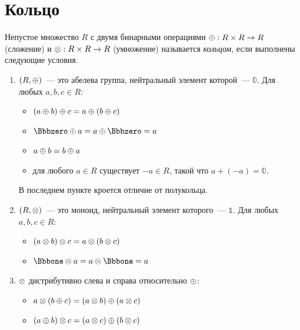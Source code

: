 \section{Кольцо}
\label{sec:Ring}

\begin{definition}[Кольцо]
    Непустое множество $R$ с двумя бинарными операциями $\oplus: R \times R \to R$ (сложение) и $\otimes: R \times R \to R$ (умножение) называется \emph{кольцом}, если выполнены следующие условия.
    \begin{enumerate}
        \item $(R, \oplus)$~--- это абелева группа, нейтральный элемент которой~--- $\Bbbzero$.
              Для любых $a, b, c \in R$:
              \begin{itemize}
                  \item $(a \oplus b) \oplus c = a \oplus (b \oplus c)$
                  \item $\Bbbzero \opAdd a = a \opAdd \Bbbzero = a$
                  \item $a \oplus b = b \oplus a$
                  \item для любого $a \in R$ существует $-a \in  R$, такой что $a + (-a) = \Bbbzero$.
              \end{itemize}
              В последнем пункте кроется отличие от полукольца.
              \item $(R, \otimes)$~--- это моноид, нейтральный элемент которого~--- $\Bbbone$.
              Для любых $a, b, c \in R$:
              \begin{itemize}
                  \item $(a \otimes b) \otimes c = a \otimes (b \otimes c)$
                  \item $\Bbbone \opMult a = a \opMult \Bbbone = a$
              \end{itemize}
        \item $\otimes$ дистрибутивно слева и справа относительно $\oplus$:
              \begin{itemize}
                  \item $a \otimes (b \oplus c) = (a \otimes b) \oplus (a \otimes c)$
                  \item $(a \oplus b) \otimes c = (a \otimes c) \oplus (b \otimes c)$
              \end{itemize}
    \end{enumerate}
\end{definition}

